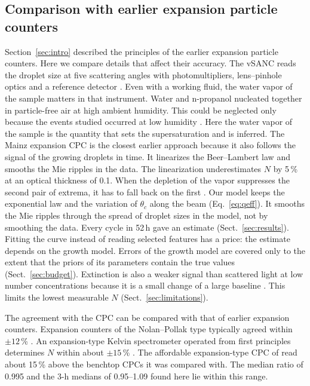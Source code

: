 \documentclass[preprint,review,12pt,authoryear]{elsarticle}
\begin{document}
\subsection{Comparison with earlier expansion particle counters}
\label{sec:earlier}
Section~\ref{sec:intro} described the principles of the earlier expansion particle counters. Here we compare
details that affect their accuracy.
The vSANC reads the droplet size at five scattering angles with photomultipliers, lens--pinhole
optics and a reference detector \citep{pinterich2016vsanc}.
Even with a working fluid, the water vapor of the sample matters in that instrument.
Water and n-propanol nucleated together in particle-free air at high ambient humidity. This could
be neglected only because the events studied occurred at low humidity \citep{pinterich2016vsanc}.
Here the water vapor of the sample is the quantity that sets the supersaturation and is inferred.
The Mainz expansion CPC is the closest earlier approach because it also follows the signal of the
growing droplets in time. It linearizes the Beer--Lambert law and smooths the Mie ripples in the data. The
linearization
underestimates $N$ by 5\,\% at an optical thickness of 0.1.
When the depletion of the vapor suppresses the second pair of extrema, it has to fall back on the first
\citep{saghafifar2009modified}.
Our model keeps the exponential law and the variation of $\theta_c$ along the beam (Eq.~\ref{eq:qeff}). It
smooths the Mie ripples through the spread of droplet sizes in the model, not by smoothing the data.
Every cycle in 52\,h gave an estimate (Sect.~\ref{sec:results}).
Fitting the curve instead of reading selected features has a price: the estimate depends on the growth
model. Errors of the
growth model are covered only to the extent that the priors of its parameters contain the true values
(Sect.~\ref{sec:budget}).
Extinction is also a weaker signal than scattered light at low number concentrations because it is a small
change of a large baseline \citep{kurten2005automated}.
This limits the lowest measurable $N$ (Sect.~\ref{sec:limitations}).

The agreement with the CPC can be compared with that of earlier expansion counters. Expansion counters
of the Nolan--Pollak type typically agreed within $\pm12$\,\% \citep{gras2002nolan}. An
expansion-type Kelvin spectrometer operated from first principles determines $N$ within about
$\pm15$\,\% \citep{hollander2002theoretical}. The affordable expansion-type CPC of
\citet{hering2025affordable} read about 15\,\% above the benchtop CPCs it was compared with. The
median ratio of 0.995 and the 3-h medians of 0.95--1.09 found here lie within this range.
\end{document}
